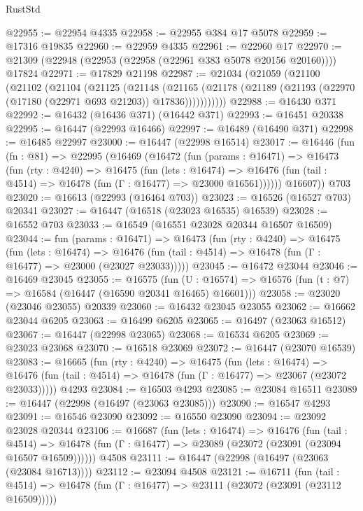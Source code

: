 \begin{lexlean}{RustStd}
\begin{coremodule}
{\begin{coremodule}
{{{{{{{{{{{{{{{{{{{{{{{{{{{{{{{{{{{{{{{{{{{{{{{{{{{{{{{@22955 := @22954 @4335
@22958 := @22955 @384 @17 @5078
@22959 := @17316 @19835
@22960 := @22959 @4335
@22961 := @22960 @17
@22970 := @21309 (@22948 (@22953 (@22958 (@22961 @383 @5078 @20156 @20160)))) @17824
@22971 := @17829 @21198
@22987 := @21034
    (@21059
      (@21100
        (@21102
          (@21104
            (@21125
              (@21148
                (@21165
                  (@21178 (@21189 (@21193 (@22970 (@17180 (@22971 @693 @21203)) @17836)))))))))))
@22988 := @16430 @371
@22992 := @16432 (@16436 @371) (@16442 @371)
@22993 := @16451 @20338
@22995 := @16447 (@22993 @16466)
@22997 := @16489 (@16490 @371)
@22998 := @16485 @22997
@23000 := @16447 (@22998 @16514)
@23017 := @16446
    (fun (fn : @81) =>
    @22995
      (@16469
        (@16472
          (fun (params : @16471) =>
          @16473
            (fun (rty : @4240) =>
            @16475
              (fun (lets : @16474) =>
              @16476 (fun (tail : @4514) => @16478 (fun (Γ : @16477) => @23000 @16561))))))
        @16607))
    @703
@23020 := @16613 (@22993 (@16464 @703))
@23023 := @16526 (@16527 @703) @20341
@23027 := @16447 (@16518 (@23023 @16535) @16539)
@23028 := @16552 @703
@23033 := @16549 (@16551 @23028 @20344 @16507 @16509)
@23044 := fun (params : @16471) =>
  @16473
    (fun (rty : @4240) =>
    @16475
      (fun (lets : @16474) =>
      @16476 (fun (tail : @4514) => @16478 (fun (Γ : @16477) => @23000 (@23027 @23033)))))
@23045 := @16472 @23044
@23046 := @16469 @23045
@23055 := @16575
    (fun (U : @16574) => @16576 (fun (t : @7) => @16584 (@16447 (@16590 @20341 @16465) @16601)))
@23058 := @23020 (@23046 @23055) @20339
@23060 := @16432 @23045 @23055
@23062 := @16662 @23044 @6205
@23063 := @16499 @6205
@23065 := @16497 (@23063 @16512)
@23067 := @16447 (@22998 @23065)
@23068 := @16534 @6205
@23069 := @23023 @23068
@23070 := @16518 @23069
@23072 := @16447 (@23070 @16539)
@23083 := @16665
    (fun (rty : @4240) =>
    @16475
      (fun (lets : @16474) =>
      @16476 (fun (tail : @4514) => @16478 (fun (Γ : @16477) => @23067 (@23072 @23033)))))
    @4293
@23084 := @16503 @4293
@23085 := @23084 @16511
@23089 := @16447 (@22998 (@16497 (@23063 @23085)))
@23090 := @16547 @4293
@23091 := @16546 @23090
@23092 := @16550 @23090
@23094 := @23092 @23028 @20344
@23106 := @16687
    (fun (lets : @16474) =>
    @16476
      (fun (tail : @4514) =>
      @16478 (fun (Γ : @16477) => @23089 (@23072 (@23091 (@23094 @16507 @16509))))))
    @4508
@23111 := @16447 (@22998 (@16497 (@23063 (@23084 @16713))))
@23112 := @23094 @4508
@23121 := @16711
    (fun (tail : @4514) => @16478 (fun (Γ : @16477) => @23111 (@23072 (@23091 (@23112 @16509)))))
}}}}}}}}}}}}}}}}}}}}}}}}}}}}}}}}}}}}}}}}}}}}}}}}}}}}}}}
\end{coremodule}}
\end{coremodule}
\end{lexlean}

